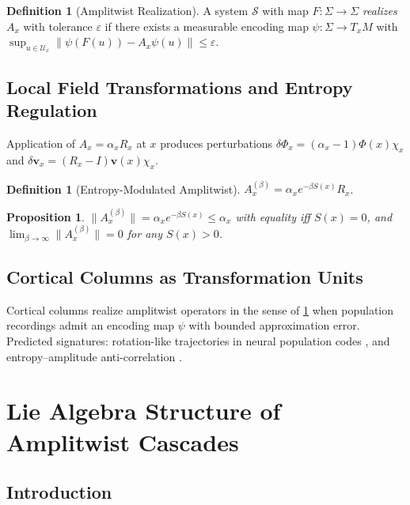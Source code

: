 \documentclass[12pt,a4paper,oneside]{book}
\numberwithin{equation}{chapter}
\theoremstyle{plain}
\newtheorem{proposition}[theorem]{Proposition}
\theoremstyle{definition}
\newtheorem{definition}[theorem]{Definition}
\theoremstyle{remark}
\begin{document}
\begin{definition}[Amplitwist Realization]
\label{def:realization}
A system $\mathcal{S}$ with map $F : \Sigma \rightarrow \Sigma$
\emph{realizes} $A_x$ with tolerance $\varepsilon$ if there exists
a measurable encoding map $\psi : \Sigma \rightarrow T_x M$ with
$\sup_{u \in \mathcal{U}_x} \|\psi(F(u)) - A_x\psi(u)\| \leq
\varepsilon$.
\end{definition}

\section{Local Field Transformations and Entropy Regulation}

Application of $A_x = \alpha_x R_x$ at $x$ produces perturbations
$\delta\Phi_x = (\alpha_x-1)\Phi(x)\chi_x$ and
$\delta\mathbf{v}_x = (R_x-I)\mathbf{v}(x)\chi_x$.

\begin{definition}[Entropy-Modulated Amplitwist]
$A^{(\beta)}_x = \alpha_x e^{-\beta S(x)} R_x$.
\end{definition}

\begin{proposition}
\label{prop:entropy-modulation}
$\|A^{(\beta)}_x\| = \alpha_x e^{-\beta S(x)} \leq \alpha_x$ with
equality iff $S(x)=0$, and $\lim_{\beta\to\infty}\|A^{(\beta)}_x\|
= 0$ for any $S(x)>0$.
\end{proposition}

\section{Cortical Columns as Transformation Units}

Cortical columns \cite{mountcastle1957} realize amplitwist operators
in the sense of \cref{def:realization} when population recordings
admit an encoding map $\psi$ with bounded approximation error.
Predicted signatures: rotation-like trajectories in neural population
codes \cite{dicarlo2015}, and entropy--amplitude anti-correlation
\cite{richman2000,higgins2017}.


\chapter[Lie Algebra Structure of Cascades]{Lie Algebra Structure of Amplitwist Cascades}
\label{ch:amplitwist-lie}

\section{Introduction}
\end{document}
